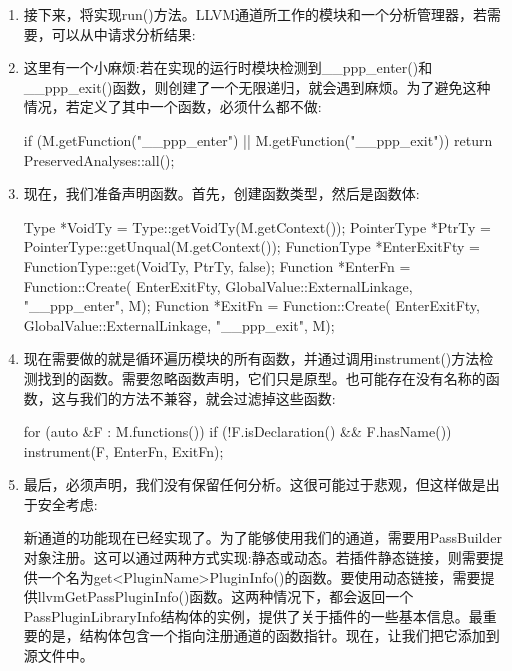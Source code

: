 \begin{enumerate}
\item
接下来，将实现run()方法。LLVM通道所工作的模块和一个分析管理器，若需要，可以从中请求分析结果:

\begin{cpp}
PreservedAnalyses
PPProfilerIRPass::run(Module &M,
                      ModuleAnalysisManager &AM) {
\end{cpp}

\item
这里有一个小麻烦:若在实现的运行时模块检测到\_\_ppp\_enter()和\_\_ppp\_exit()函数，则创建了一个无限递归，就会遇到麻烦。为了避免这种情况，若定义了其中一个函数，必须什么都不做:

\begin{cpp}
    if (M.getFunction("__ppp_enter") ||
        M.getFunction("__ppp_exit")) {
            return PreservedAnalyses::all();
    }
\end{cpp}

\item
现在，我们准备声明函数。首先，创建函数类型，然后是函数体:

\begin{cpp}
    Type *VoidTy = Type::getVoidTy(M.getContext());
    PointerType *PtrTy =
        PointerType::getUnqual(M.getContext());
    FunctionType *EnterExitFty =
        FunctionType::get(VoidTy, {PtrTy}, false);
    Function *EnterFn = Function::Create(
        EnterExitFty, GlobalValue::ExternalLinkage,
        "__ppp_enter", M);
    Function *ExitFn = Function::Create(
        EnterExitFty, GlobalValue::ExternalLinkage,
        "__ppp_exit", M);
\end{cpp}

\item
现在需要做的就是循环遍历模块的所有函数，并通过调用instrument()方法检测找到的函数。需要忽略函数声明，它们只是原型。也可能存在没有名称的函数，这与我们的方法不兼容，就会过滤掉这些函数:

\begin{cpp}
    for (auto &F : M.functions()) {
        if (!F.isDeclaration() && F.hasName())
            instrument(F, EnterFn, ExitFn);
    }
\end{cpp}

\item
最后，必须声明，我们没有保留任何分析。这很可能过于悲观，但这样做是出于安全考虑:

\begin{cpp}
    return PreservedAnalyses::none();
}
\end{cpp}

新通道的功能现在已经实现了。为了能够使用我们的通道，需要用PassBuilder对象注册。这可以通过两种方式实现:静态或动态。若插件静态链接，则需要提供一个名为get<PluginName>PluginInfo()的函数。要使用动态链接，需要提供llvmGetPassPluginInfo()函数。这两种情况下，都会返回一个PassPluginLibraryInfo结构体的实例，提供了关于插件的一些基本信息。最重要的是，结构体包含一个指向注册通道的函数指针。现在，让我们把它添加到源文件中。


\end{enumerate}
